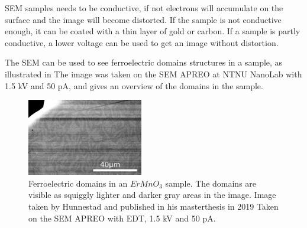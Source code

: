 SEM samples needs to be conductive, if not electrons will accumulate on the surface and the image will become distorted.
If the sample is not conductive enough, it can be coated with a thin layer of gold or carbon.
If a sample is partly conductive, a lower voltage can be used to get an image without distortion.

The SEM can be used to see ferroelectric domains structures in a sample, as illustrated in %
The image was taken on the SEM APREO at NTNU NanoLab with 1.5 kV and 50 pA, and gives an overview of the domains in the sample.



\begin{figure}
    \centering
    \includegraphics[width=0.45\textwidth]{figures/ferroelectric_domains_SEM_Hunnestad2019.jpg}
    \caption{
        Ferroelectric domains in an $ErMnO_3$ sample.
        The domains are visible as squiggly lighter and darker gray areas in the image.
        Image taken by Hunnestad and published in his masterthesis in 2019 %
        Taken on the SEM APREO with EDT, 1.5 kV and 50 pA.
    }
    \label{fig:ferroelectric_domains_SEM_Hunnestad2019}
\end{figure}

